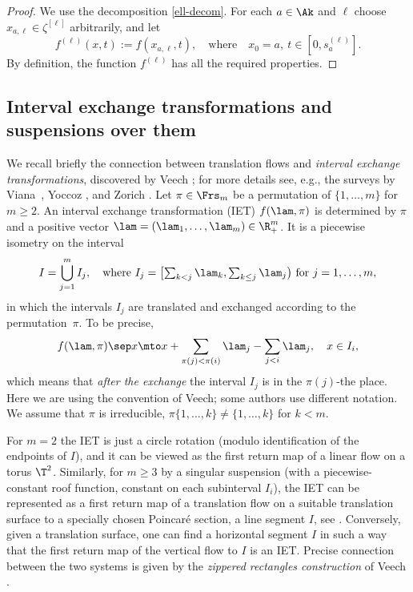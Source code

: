 \begin{proof}
We use the decomposition \eqref{ell-decom}. For each $a\in \Ak$ and $\ell$ choose $x_{a,\ell}\in \zeta^{[\ell]}$ arbitrarily, and let
\[
f^{(\ell)}(x,t):= f(x_{a,\ell},t),\quad \text{where}\quad x_0=a,\ t\in [0, s_a^{(\ell)}].
\]
By definition, the function $f^{(\ell)}$ has all the required properties.
\end{proof}

\subsection{Interval exchange transformations and suspensions over them} \label{subsec-IET}

We recall briefly the connection between translation flows and \emph{interval exchange transformations}, discovered by Veech \cite{Veech0,
veech}; for more details see, e.g., the surveys by Viana~\cite{viana2}, Yoccoz \cite{yoccoz}, and Zorich \cite{Zorich1}. Let $\pi\in \Frs_m$ be a permutation of $\{1,\ldots,m\}$ for $m\ge 2$.
An interval exchange transformation (IET) $f(\lam,\pi)$ is determined by $\pi$ and a positive vector $\lam = (\lam_1,\ldots,\lam_m)\in \R^m_+$. It is a piecewise isometry on the interval
\[
I = \bigcup_{j=1}^m I_j,\quad \text{where }I_j = \textstyle\bigl[\sum_{k<j}\lam_k, \sum_{k\le j} \lam_j\bigr)\text{ for }j=1,\ldots,m,
\]
in which the intervals $I_j$ are translated and exchanged according to the permutation~$\pi$.
To be precise,
\[
f(\lam,\pi)\sep x\mto x + \sum_{\pi(j) < \pi(i)} \lam_j - \sum_{j < i} \lam_j,\quad x\in I_i,
\]
which means that \emph{after the exchange} the interval $I_j$ is in the $\pi(j)$-the place. Here we are using the convention of Veech; some authors use different notation.
We assume that $\pi$ is irreducible, \ie $\pi\{1,\ldots,k\}\ne \{1,\ldots,k\}$ for $k<m$.

For $m=2$ the IET is just a circle rotation (modulo identification of the endpoints of $I$), and it can be viewed as the first return map of a linear flow on a torus $\T^2$. Similarly, for $m\ge 3$ by a singular suspension (with a piecewise-constant roof function, constant on each subinterval $I_i$), the IET can be represented as a first return map of a translation flow on a suitable translation surface to a specially chosen Poincaré section, a line segment $I$, see \cite{Veech0,veech}. Conversely,
given a translation surface, one can find a horizontal segment $I$ in such a way that the first return map of the vertical flow to $I$ is an IET. Precise connection between the two systems is given by the \emph{zippered rectangles construction} of Veech \cite{veech}.

